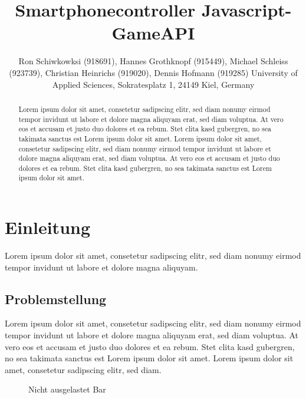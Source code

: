 \documentclass[a4paper]{spie}  %
\title{Smartphonecontroller Javascript-GameAPI}
\author{ Ron Schiwkowksi  (918691), Hannes Grothknopf (915449), Michael Schleiss (923739), Christian Heinrichs (919020), Dennis Hofmann (919285)
\skiplinehalf
University of Applied Sciences, Sokratesplatz 1, 24149 Kiel, Germany
}
\begin{document}
 
  \maketitle 
\begin{abstract}
Lorem ipsum dolor sit amet, consetetur sadipscing elitr, sed diam nonumy eirmod tempor invidunt ut labore et dolore magna aliquyam erat, sed diam voluptua. At vero eos et accusam et justo duo dolores et ea rebum. Stet clita kasd gubergren, no sea takimata sanctus est Lorem ipsum dolor sit amet. Lorem ipsum dolor sit amet, consetetur sadipscing elitr, sed diam nonumy eirmod tempor invidunt ut labore et dolore magna aliquyam erat, sed diam voluptua. At vero eos et accusam et justo duo dolores et ea rebum. Stet clita kasd gubergren, no sea takimata sanctus est Lorem ipsum dolor sit amet.
\end{abstract}


\section{Einleitung}
Lorem ipsum dolor sit amet, consetetur sadipscing elitr, sed diam nonumy eirmod tempor invidunt ut labore et dolore magna aliquyam.

\subsection{Problemstellung}
Lorem ipsum dolor sit amet, consetetur sadipscing elitr, sed diam nonumy eirmod tempor invidunt ut labore et dolore magna aliquyam erat, sed diam voluptua. At vero eos et accusam et justo duo dolores et ea rebum. Stet clita kasd gubergren, no sea takimata sanctus est Lorem ipsum dolor sit amet. Lorem ipsum dolor sit amet, consetetur sadipscing elitr, sed diam.
\begin{figure}[h!]
	\centering
		\caption{Nicht ausgelastet Bar}
		\label{fig:FrontendInit}
\end{figure}
\end{document}
